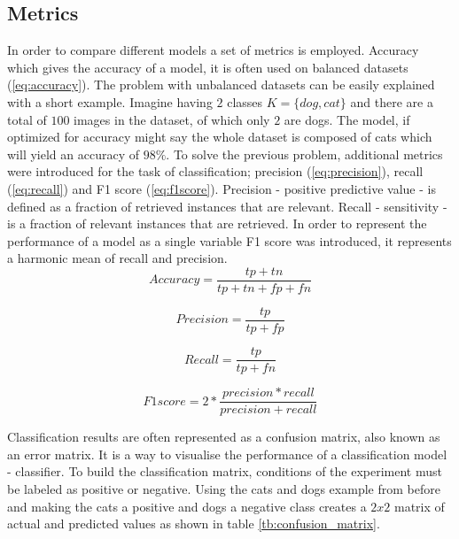 \documentclass[times, utf8, diplomski]{fer}
\begin{document}
\subsection{Metrics}
\label{se:metrics}
In order to compare different models a set of metrics is employed. Accuracy which gives the accuracy of a model, it is often used on balanced datasets (\ref{eq:accuracy}). The problem with unbalanced datasets can be easily explained with a short example. Imagine having $2$ classes $K=\{dog,cat\}$ and there are a total of $100$ images in the dataset, of which only $2$ are dogs. The model, if optimized for accuracy might say the whole dataset is composed of cats which will yield an accuracy of $98\%$. To solve the previous problem, additional metrics were introduced for the task of classification; precision (\ref{eq:precision}), recall (\ref{eq:recall}) and F1 score (\ref{eq:f1score}). Precision - positive predictive value - is defined as a fraction of retrieved instances that are relevant. Recall - sensitivity - is a fraction of relevant instances that are retrieved. In order to represent the performance of a model as a single variable F1 score was introduced, it represents a harmonic mean of recall and precision.
\begin{equation} \label{eq:accuracy}
    Accuracy = \frac{tp + tn}{tp + tn + fp + fn}
\end{equation}

\begin{equation} \label{eq:precision}
    Precision = \frac{tp}{tp + fp}
\end{equation}

\begin{equation} \label{eq:recall}
    Recall = \frac{tp}{tp + fn}
\end{equation}

\begin{equation} \label{eq:f1score}
    F1 score = 2 * \frac{precision * recall}{precision + recall}
\end{equation}



Classification results are often represented as a confusion matrix, also known as an error matrix.  It is a  way to visualise the performance of a classification model - classifier. To build the classification matrix, conditions of the experiment must be labeled as positive or negative. Using the cats and dogs example from before and making the cats a positive and dogs a negative class creates a $2x2$ matrix of actual and predicted values as shown in table \ref{tb:confusion_matrix}.
\end{document}
